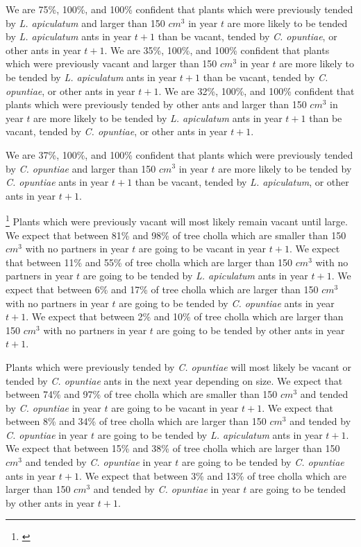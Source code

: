 \documentclass[11pt]{article}
\newcommand{\ali}[2]{{\color{blue}{#1}}\footnote{\textit{\color{blue}{#2}}}}
\begin{document}
We are 75\%, 100\%, and 100\% confident that plants which were previously tended by \textit{L. apiculatum} and larger than 150 $cm^3$ in year $t$ are more likely to be tended by \textit{L. apiculatum} ants in year $t+1$ than be vacant, tended by \textit{C. opuntiae}, or other ants in year $t+1$.
We are 35\%, 100\%, and 100\% confident that plants which were previously vacant and larger than 150 $cm^3$ in year $t$ are more likely to be tended by \textit{L. apiculatum} ants in year $t+1$ than be vacant, tended by \textit{C. opuntiae}, or other ants in year $t+1$.
We are 32\%, 100\%, and 100\% confident that plants which were previously tended by other ants and larger than 150 $cm^3$ in year $t$ are more likely to be tended by \textit{L. apiculatum} ants in year $t+1$ than be vacant, tended by \textit{C. opuntiae}, or other ants in year $t+1$.

We are 37\%, 100\%, and 100\% confident that plants which were previously tended by \textit{C. opuntiae} and larger than 150 $cm^3$ in year $t$ are more likely to be tended by \textit{C. opuntiae} ants in year $t+1$ than be vacant, tended by \textit{L. apiculatum}, or other ants in year $t+1$.

\ali{}{Or I can do this section like this:}
Plants which were previously vacant will most likely remain vacant until large. 
We expect that between 81\% and 98\% of tree cholla which are smaller than 150 $cm^3$ with no partners in year $t$ are going to be vacant in year $t+1$.
We expect that between 11\% and 55\% of tree cholla which are larger than 150 $cm^3$ with no partners in year $t$ are going to be tended by \textit{L. apiculatum} ants in year $t+1$.
We expect that between 6\% and 17\% of tree cholla which are larger than 150 $cm^3$ with no partners in year $t$ are going to be tended by \textit{C. opuntiae} ants in year $t+1$.
We expect that between 2\% and 10\% of tree cholla which are larger than 150 $cm^3$ with no partners in year $t$ are going to be tended by other ants in year $t+1$.

Plants which were previously tended by \textit{C. opuntiae} will most likely be vacant or tended by \textit{C. opuntiae} ants in the next year depending on size. 
We expect that between 74\% and 97\% of tree cholla which are smaller than 150 $cm^3$ and tended by \textit{C. opuntiae} in year $t$ are going to be vacant in year $t+1$.
We expect that between 8\% and 34\% of tree cholla which are larger than 150 $cm^3$ and tended by \textit{C. opuntiae} in year $t$ are going to be tended by \textit{L. apiculatum} ants in year $t+1$.
We expect that between 15\% and 38\% of tree cholla which are larger than 150 $cm^3$ and tended by \textit{C. opuntiae} in year $t$ are going to be tended by \textit{C. opuntiae} ants in year $t+1$.
We expect that between 3\% and 13\% of tree cholla which are larger than 150 $cm^3$ and tended by \textit{C. opuntiae} in year $t$ are going to be tended by other ants in year $t+1$.
\end{document}
